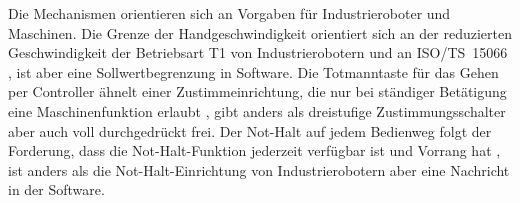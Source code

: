 
Die Mechanismen orientieren sich an Vorgaben für Industrieroboter und Maschinen.
Die Grenze der Handgeschwindigkeit orientiert sich an der reduzierten Geschwindigkeit der Betriebsart T1 von Industrierobotern \cite{DGUV2015} und an ISO/TS~15066 \cite{Villani2018}, ist aber eine Sollwertbegrenzung in Software.
Die Totmanntaste für das Gehen per Controller ähnelt einer Zustimmeinrichtung, die nur bei ständiger Betätigung eine Maschinenfunktion erlaubt \cite{DGUV2015}, gibt anders als dreistufige Zustimmungsschalter \cite{DGUV2015} aber auch voll durchgedrückt frei.
Der Not-Halt auf jedem Bedienweg folgt der Forderung, dass die Not-Halt-Funktion jederzeit verfügbar ist und Vorrang hat \cite{DINENISO13850}, ist anders als die Not-Halt-Einrichtung von Industrierobotern \cite{DGUV2015} aber eine Nachricht in der Software.

